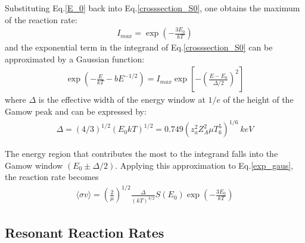 Substituting Eq.\ref{E_0} back into Eq.\ref{crosssection_S0}, one obtains the maximum of the reaction rate:
\begin{equation}
    \label{I_max}
    \begin{aligned}
        I_{max} = \exp(-\frac{3E_0}{kT})
    \end{aligned}
\end{equation}
and the exponential term in the integrand of Eq.\ref{crosssection_S0} can be approximated by a Gaussian function:
\begin{equation}
    \label{exp_gaus}
    \begin{aligned}
        \exp{(-\frac{E}{kT}-bE^{-1/2})} = I_{max}\exp[-(\frac{E-E_0}{\Delta /2})^2]
    \end{aligned}
\end{equation}
where $\Delta$ is the effective width of the energy window at  $1/e$ of the height of the Gamow peak and can be expressed by:
\begin{equation}
    \label{delta}
    \begin{aligned}
        \Delta = (4/3)^{1/2}(E_0kT)^{1/2}=0.749(z_a^2 Z_A^2 \mu T_6^5)^{1/6} \ keV
    \end{aligned}
\end{equation}


The energy region that contributes the most to the integrand falls into the Gamow window $(E_0\pm \Delta/2)$. Applying this approximation to Eq.\ref{exp_gaus}, the reaction rate becomes
\begin{equation}
    \label{crosssection_E0}
    \begin{aligned}
        \langle \sigma v \rangle  =  (\frac{2}{\mu})^{1/2} \frac{\Delta}{(kT)^{3/2}}S(E_0)\exp(-\frac{3E_0}{kT})
    \end{aligned}
\end{equation}



\subsection{Resonant Reaction Rates}

